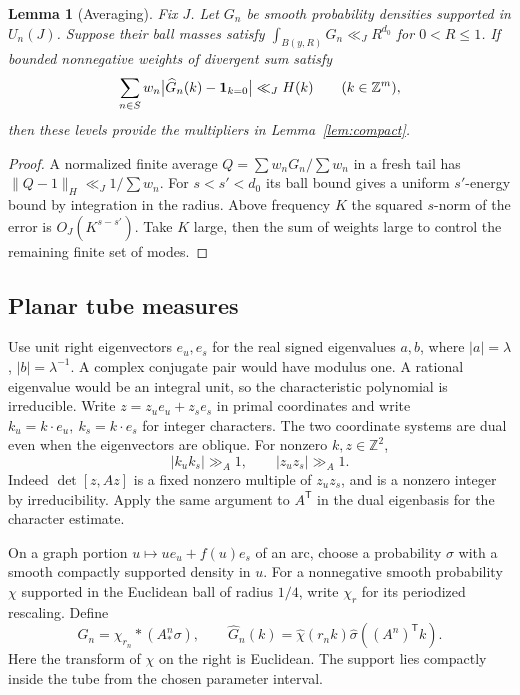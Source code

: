 \documentclass[11pt,a4paper,reqno]{amsart}
\newtheorem{lemma}[theorem]{Lemma}
\theoremstyle{definition}
\theoremstyle{remark}
\numberwithin{equation}{section}
\begin{document}
\begin{lemma}[Averaging]\label{lem:average}
Fix \(J\). Let \(G_n\) be smooth probability densities supported in
\(U_n(J)\). Suppose their ball masses satisfy
\(\int_{B(y,R)}G_n\ll_J R^{d_0}\) for \(0<R\le1\). If bounded
nonnegative weights of divergent sum satisfy
\begin{equation}\label{eq:weighted}
 \sum_{n\in S}w_n\big|\widehat G_n(k)-{\bf1}_{k=0}\big|
       \ll_J H(k)\qquad(k\in\mathbb Z^m),
\end{equation}
then these levels provide the multipliers in Lemma~\ref{lem:compact}.
\end{lemma}
\begin{proof}
A normalized finite average \(Q=\sum w_nG_n/\sum w_n\) in a fresh tail
has \(\|Q-1\|_H\ll_J1/\sum w_n\). For \(s<s'<d_0\) its ball bound gives
a uniform \(s'\)-energy bound by integration in the radius. Above
frequency \(K\) the squared \(s\)-norm of the error is \(O_J(K^{s-s'})\).
Take \(K\) large, then the sum of weights large to control the remaining
finite set of modes.
\end{proof}

\subsection{Planar tube measures}
Use unit right eigenvectors \(e_u,e_s\) for the real signed eigenvalues
\(a,b\), where \(|a|=\lambda\), \(|b|=\lambda^{-1}\).
A complex conjugate pair would have modulus one. A rational
eigenvalue would be an integral unit, so the characteristic polynomial
is irreducible. Write \(z=z_u e_u+z_s e_s\) in primal coordinates and
write \(k_u=k\cdot e_u,\ k_s=k\cdot e_s\) for integer characters.
The two coordinate systems are dual even when the eigenvectors are oblique.
For nonzero \(k,z\in\mathbb Z^2\),
\begin{equation}\label{eq:norm}
             |k_u k_s|\gg_A1,\qquad |z_u z_s|\gg_A1.
\end{equation}
Indeed \(\det[z,Az]\) is a fixed nonzero multiple of \(z_u z_s\),
and is a nonzero integer by irreducibility. Apply the same argument to
\(A^{\mathsf T}\) in the dual eigenbasis for the character estimate.

On a graph portion \(u\mapsto u e_u+f(u)e_s\) of an arc, choose a
probability \(\sigma\) with a smooth compactly supported density in \(u\).
For a nonnegative smooth probability \(\chi\) supported in the Euclidean
ball of radius \(1/4\), write \(\chi_r\) for its periodized rescaling.
Define
\begin{equation}\label{eq:tube}
 G_n=\chi_{r_n}*(A^n_*\sigma),\qquad
 \widehat G_n(k)=\widehat\chi(r_n k)\widehat\sigma((A^n)^{\mathsf T} k).
\end{equation}
Here the transform of \(\chi\) on the right is Euclidean. The support
lies compactly inside the tube from the chosen parameter interval.
\end{document}
